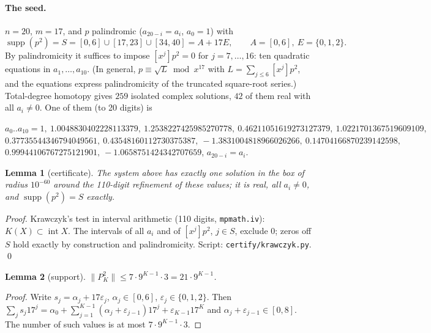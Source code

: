 \documentclass[11pt]{article}
\newtheorem{lemma}{Lemma}
\theoremstyle{remark}\newtheorem*{remark}{Remark}
\newcommand{\supp}{\operatorname{supp}}
\begin{document}
\paragraph{The seed.} $n=20$, $m=17$, and $p$ palindromic ($a_{20-i}=a_i$, $a_0=1$) with
\[\supp(p^2)=S=[0,6]\cup[17,23]\cup[34,40]=A+17E,\qquad A=[0,6],\ E=\{0,1,2\}.\]
By palindromicity it suffices to impose $[x^j]p^2=0$ for $j=7,\dots,16$: ten quadratic equations in $a_1,\dots,a_{10}$. (In general, $p\equiv\sqrt{L}\bmod x^{17}$ with $L=\sum_{j\le 6}[x^j]p^2$, and the equations express palindromicity of the truncated square-root series.) Total-degree homotopy gives $259$ isolated complex solutions, $42$ of them real with all $a_i\neq0$. One of them (to 20 digits) is
\begin{center}\small
$a_0..a_{10}=1,\ 1.0048830402228113379,\ 1.2538227425985270778,\ 0.46211051619273127379,\ 1.0221701367519609109,$\\
$0.37735544346794049561,\ 0.43548160112730375387,\ -1.3831004818966026266,\ 0.14704166870239142598,$\\
$0.99944106767275121901,\ -1.0658751424342707659$, \quad $a_{20-i}=a_i$.
\end{center}

\begin{lemma}[certificate]\label{cert}
The system above has exactly one solution in the box of radius $10^{-60}$ around the 110-digit refinement of these values; it is real, all $a_i\ne0$, and $\supp(p^2)=S$ exactly.
\end{lemma}
\noindent\emph{Proof.} Krawczyk's test in interval arithmetic (110 digits, \texttt{mpmath.iv}): $K(X)\subset\operatorname{int}X$. The intervals of all $a_i$ and of $[x^j]p^2$, $j\in S$, exclude $0$; zeros off $S$ hold exactly by construction and palindromicity. Script: \texttt{certify/krawczyk.py}. \qed

\begin{lemma}[support]\label{supp}
$\|P_K^2\|\le 7\cdot 9^{K-1}\cdot 3=21\cdot 9^{K-1}$.
\end{lemma}
\begin{proof}Write $s_j=\alpha_j+17\varepsilon_j$, $\alpha_j\in[0,6]$, $\varepsilon_j\in\{0,1,2\}$. Then $\sum_j s_j17^j=\alpha_0+\sum_{j=1}^{K-1}(\alpha_j+\varepsilon_{j-1})17^j+\varepsilon_{K-1}17^K$ and $\alpha_j+\varepsilon_{j-1}\in[0,8]$. The number of such values is at most $7\cdot9^{K-1}\cdot3$.\end{proof}
\end{document}
